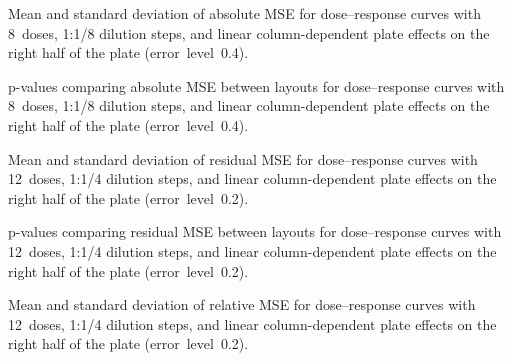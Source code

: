 \begin{table}[p]
    \centering
    \small
    
    \caption{Mean and standard deviation of absolute \ECIC{} MSE for dose--response curves with 8~doses, 1:1/8 dilution steps, and linear column-dependent plate effects on the right half of the plate (error~level~0.4).}
    \label{tab:dr-absic50-mean-std-8doses-dil8-half-columns-neg-controls-0.4}
\end{table}

\clearpage
\begin{table}[p]
    \centering
    \small
    
    \caption{p-values comparing absolute \ECIC{} MSE between layouts for dose--response curves with 8~doses, 1:1/8 dilution steps, and linear column-dependent plate effects on the right half of the plate (error~level~0.4).}
    \label{tab:dr-absic50-pvalues-8doses-dil8-half-columns-neg-controls-0.4}
\end{table}

\begin{table}[p]
    \centering
    \small
    
    \caption{Mean and standard deviation of residual MSE for dose--response curves with 12~doses, 1:1/4 dilution steps, and linear column-dependent plate effects on the right half of the plate (error~level~0.2).}
    \label{tab:dr-residuals-mean-std-12doses-dil4-half-columns-neg-controls-0.2}
\end{table}

\begin{table}[p]
    \centering
    \small
    
    \caption{p-values comparing residual MSE between layouts for dose--response curves with 12~doses, 1:1/4 dilution steps, and linear column-dependent plate effects on the right half of the plate (error~level~0.2).}
    \label{tab:dr-residuals-pvalues-12doses-dil4-half-columns-neg-controls-0.2}
\end{table}

\begin{table}[p]
    \centering
    \small
    
    \caption{Mean and standard deviation of relative \ECIC{} MSE for dose--response curves with 12~doses, 1:1/4 dilution steps, and linear column-dependent plate effects on the right half of the plate (error~level~0.2).}
    \label{tab:dr-relic50-mean-std-12doses-dil4-half-columns-neg-controls-0.2}
\end{table}

